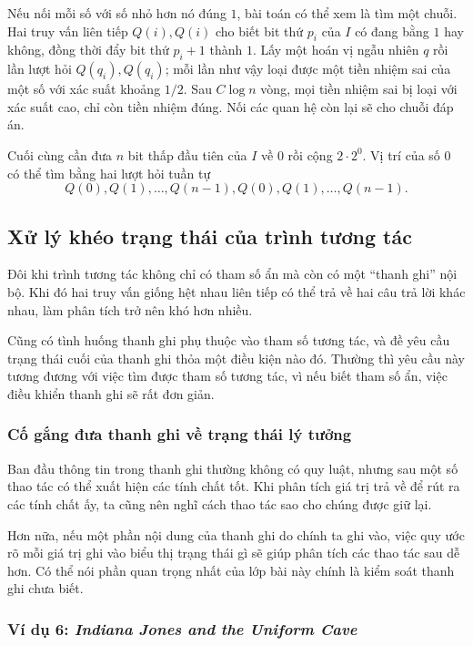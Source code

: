 \documentclass[11pt]{article}
\begin{document}
Nếu nối mỗi số với số nhỏ hơn nó đúng $1$, bài toán có thể xem là tìm một
chuỗi. Hai truy vấn liên tiếp $Q(i),Q(i)$ cho biết bit thứ $p_i$ của $I$ có
đang bằng $1$ hay không, đồng thời đẩy bit thứ $p_i+1$ thành $1$. Lấy một hoán
vị ngẫu nhiên $q$ rồi lần lượt hỏi $Q(q_i),Q(q_i)$; mỗi lần như vậy loại được
một tiền nhiệm sai của một số với xác suất khoảng $1/2$. Sau $C\log n$ vòng,
mọi tiền nhiệm sai bị loại với xác suất cao, chỉ còn tiền nhiệm đúng. Nối các
quan hệ còn lại sẽ cho chuỗi đáp án.

Cuối cùng cần đưa $n$ bit thấp đầu tiên của $I$ về $0$ rồi cộng
$2\cdot2^0$. Vị trí của số $0$ có thể tìm bằng hai lượt hỏi tuần tự
\[
  Q(0),Q(1),\ldots,Q(n-1),Q(0),Q(1),\ldots,Q(n-1).
\]

\subsection{Xử lý khéo trạng thái của trình tương tác}

Đôi khi trình tương tác không chỉ có tham số ẩn mà còn có một ``thanh ghi''
nội bộ. Khi đó hai truy vấn giống hệt nhau liên tiếp có thể trả về hai câu trả
lời khác nhau, làm phân tích trở nên khó hơn nhiều.

Cũng có tình huống thanh ghi phụ thuộc vào tham số tương tác, và đề yêu cầu
trạng thái cuối của thanh ghi thỏa một điều kiện nào đó. Thường thì yêu cầu này
tương đương với việc tìm được tham số tương tác, vì nếu biết tham số ẩn, việc
điều khiển thanh ghi sẽ rất đơn giản.

\subsubsection{Cố gắng đưa thanh ghi về trạng thái lý tưởng}

Ban đầu thông tin trong thanh ghi thường không có quy luật, nhưng sau một số
thao tác có thể xuất hiện các tính chất tốt. Khi phân tích giá trị trả về để
rút ra các tính chất ấy, ta cũng nên nghĩ cách thao tác sao cho chúng được giữ
lại.

Hơn nữa, nếu một phần nội dung của thanh ghi do chính ta ghi vào, việc quy ước
rõ mỗi giá trị ghi vào biểu thị trạng thái gì sẽ giúp phân tích các thao tác
sau dễ hơn. Có thể nói phần quan trọng nhất của lớp bài này chính là kiểm soát
thanh ghi chưa biết.

\subsubsection{Ví dụ 6: \emph{Indiana Jones and the Uniform Cave}}
\end{document}
